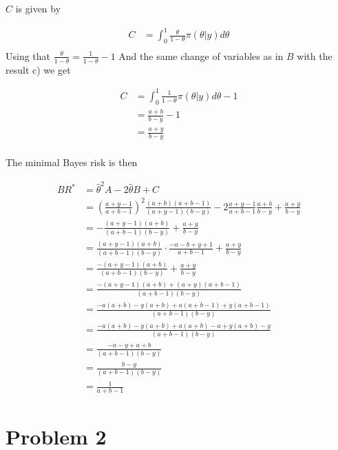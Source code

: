 \documentclass{article}
\begin{document}
\begin{enumerate}
$C$ is given by

\begin{align*}
    C &= \int_0^1 \frac{\theta}{1-\theta} \pi(\theta | y) d\theta\\
\end{align*}
Using that
$\frac{\theta}{1-\theta} = \frac{1}{1-\theta} - 1$
And the same change of variables as in $B$ with the result c) we get

\begin{align*}
    C &= \int_0^1 \frac{1}{1-\theta} \pi(\theta | y) d\theta - 1\\
    &= \frac{a+b}{b-y} - 1\\
    &= \frac{a+y}{b-y}\\
\end{align*}


The minimal Bayes risk is then

\begin{align*}
    BR^* &= \hat{\theta}^2 A -2 \hat{\theta} B + C\\
    &= \left(\frac{a + y - 1}{a + b - 1}\right)^2 \frac{(a+b)(a+b-1)}{(a+y-1)(b-y)} -2 \frac{a + y - 1}{a + b - 1} \frac{a+b}{b-y} + \frac{a+y}{b-y}\\
    &= -\frac{(a + y - 1)(a+b)}{(a + b - 1)(b-y)} + \frac{a+y}{b-y}\\
    &= \frac{(a + y - 1)(a + b)}{(a + b - 1)(b - y)} \cdot \frac{-a - b + y + 1}{a + b - 1} + \frac{a + y}{b - y} \\
    &= \frac{-(a + y - 1)(a + b)}{(a + b - 1)(b - y)} + \frac{a + y}{b - y} \\
    &= \frac{-(a + y - 1)(a + b) + (a + y)(a + b - 1)}{(a + b - 1)(b - y)} \\
    &= \frac{-a(a + b) - y(a + b) + a(a + b - 1) + y(a + b - 1)}{(a + b - 1)(b - y)} \\
    &= \frac{-a(a + b) - y(a + b) + a(a + b) - a + y(a + b) - y}{(a + b - 1)(b - y)} \\
    &= \frac{-a - y + a + b}{(a + b - 1)(b - y)} \\
    &= \frac{b - y}{(a + b - 1)(b - y)} \\
    &= \frac{1}{a + b - 1}
\end{align*}



\end{enumerate}

\section{Problem 2}
\end{document}
